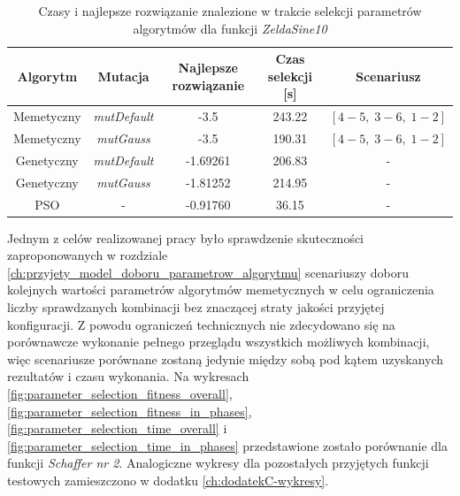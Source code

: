 \begin{table}[ht]
\caption{Czasy i najlepsze rozwiązanie znalezione w trakcie selekcji parametrów algorytmów dla funkcji \emph{ZeldaSine10}}
\label{table:selekcja_Zeldasine_czasy}
\begin{center}
\begin{tabular}{|c|c|c|c|c|}
	\hline
	Algorytm & Mutacja & Najlepsze rozwiązanie & Czas selekcji [s] & Scenariusz \\
	\hline
	Memetyczny & \emph{mutDefault} & -3.5 & 243.22 & $[4-5,\;3-6,\;1-2]$\\
	Memetyczny & \emph{mutGauss} & -3.5 & 190.31 & $[4-5,\;3-6,\;1-2]$ \\
	Genetyczny & \emph{mutDefault} & -1.69261 & 206.83 & - \\
	Genetyczny & \emph{mutGauss} & -1.81252 & 214.95 & - \\
	PSO	& - & -0.91760 & 36.15 & -\\

	\hline
	\end{tabular}
\end{center}
\end{table}

Jednym z celów realizowanej pracy było sprawdzenie skuteczności zaproponowanych w rozdziale \ref{ch:przyjety_model_doboru_parametrow_algorytmu} scenariuszy doboru kolejnych wartości parametrów algorytmów memetycznych w celu ograniczenia liczby sprawdzanych kombinacji bez znaczącej straty jakości przyjętej konfiguracji. Z powodu ograniczeń technicznych nie zdecydowano się na porównawcze wykonanie pełnego przeglądu wszystkich możliwych kombinacji, więc scenariusze porównane zostaną jedynie między sobą pod kątem uzyskanych rezultatów i czasu wykonania. Na wykresach \ref{fig:parameter_selection_fitness_overall}, \ref{fig:parameter_selection_fitness_in_phases}, \ref{fig:parameter_selection_time_overall} i \ref{fig:parameter_selection_time_in_phases} przedstawione zostało porównanie dla funkcji \emph{Schaffer nr 2}. Analogiczne wykresy dla pozostałych przyjętych funkcji testowych zamieszczono w dodatku \ref{ch:dodatekC-wykresy}.

